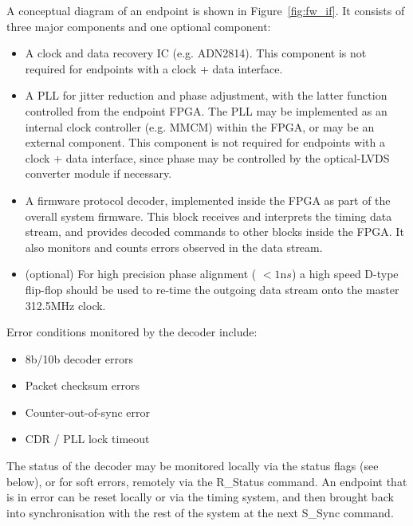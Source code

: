 \documentclass{dune}
\begin{document}
A conceptual diagram of an endpoint is shown in Figure~\ref{fig:fw_if}. It consists of three major components and one optional component:

\begin{itemize}
	\item A clock and data recovery IC (e.g. ADN2814). This component is not required for endpoints with a clock + data interface.
	\item A PLL for jitter reduction and phase adjustment, with the latter function controlled from the endpoint FPGA. The PLL may be implemented as an internal clock controller (e.g. MMCM) within the FPGA, or may be an external component. This component is not required for endpoints with a clock + data interface, since phase may be controlled by the optical-LVDS converter module if necessary.
	\item A firmware protocol decoder, implemented inside the FPGA as part of the overall system firmware. This block receives and interprets the timing data stream, and provides decoded commands to other blocks inside the FPGA. It also monitors and counts errors observed in the data stream.
	\item(optional) For high precision phase alignment ( $< 1{\mathrm ns}$) a high speed D-type flip-flop should be used to re-time the outgoing data stream onto the master 312.5MHz clock.
\end{itemize}

Error conditions monitored by the decoder include:

\begin{itemize}
	\item 8b/10b decoder errors
	\item Packet checksum errors
	\item Counter-out-of-sync error
	\item CDR / PLL lock timeout
\end{itemize}

The status of the decoder may be monitored locally via the status flags (see below), or for soft errors, remotely via the R\_Status command. An endpoint that is in error can be reset locally or via the timing system, and then brought back into synchronisation with the rest of the system at the next S\_Sync command.
\end{document}
